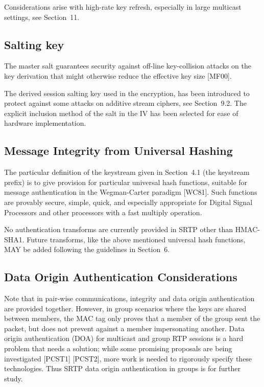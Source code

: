 \documentclass{article}
\begin{document}
Considerations arise with high-rate key refresh, especially in large multicast settings, see Section~11.

\subsection{Salting key}

The master salt guarantees security against off-line key-collision attacks on the key derivation that might otherwise reduce the effective key size [MF00].

The derived session salting key used in the encryption, has been introduced to protect against some attacks on additive stream ciphers, see Section~9.2.  The explicit inclusion method of the salt in the IV has been selected for ease of hardware implementation.

\subsection{Message Integrity from Universal Hashing}

The particular definition of the keystream given in Section~4.1 (the keystream prefix) is to give provision for particular universal hash functions, suitable for message authentication in the Wegman-Carter paradigm [WC81].  Such functions are provably secure, simple, quick, and especially appropriate for Digital Signal Processors and other processors with a fast multiply operation.

No authentication transforms are currently provided in SRTP other than HMAC-SHA1.  Future transforms, like the above mentioned universal hash functions, MAY be added following the guidelines in Section~6.

\subsection{Data Origin Authentication Considerations}

Note that in pair-wise communications, integrity and data origin authentication are provided together.  However, in group scenarios where the keys are shared between members, the MAC tag only proves that a member of the group sent the packet, but does not prevent against a member impersonating another.  Data origin authentication (DOA) for multicast and group RTP sessions is a hard problem that needs a solution; while some promising proposals are being investigated [PCST1] [PCST2], more work is needed to rigorously specify these technologies.  Thus SRTP data origin authentication in groups is for further study.
\end{document}
